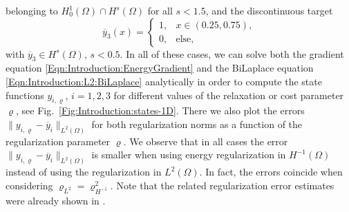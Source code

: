\documentclass{article}
\numberwithin{equation}{section}
\begin{document}
belonging to $H^1_0(\Omega)\cap H^s(\Omega)$ for all $s<1.5$,
and the discontinuous target
\begin{equation}\label{Eqn:Introduction:target-u3}
  \overline{y}_3(x) = \begin{cases}
    1,& x\in (0.25,0.75),\\
    0,& \text{else},
  \end{cases}
\end{equation}
with $\overline{y}_3 \in H^s(\Omega)$, $s<0.5$. In all of these cases, we can
solve both the gradient equation \eqref{Eqn:Introduction:EnergyGradient} and
the BiLaplace equation \eqref{Eqn:Introduction:L2:BiLaplace} analytically in
order to compute the state functions $y_{i,\varrho}$, $i=1,2,3$
for different values of the relaxation or cost parameter $\varrho$, see
Fig.~\ref{Fig:Introduction:states-1D}. There we also plot the
errors $\| y_{i,\varrho} - \overline{y}_i \|_{L^2(\Omega)}$ for both
regularization norms as a function of the regularization parameter
$\varrho$. We observe that in all cases the error
$\| y_{i,\varrho} - \overline{y}_i \|_{L^2(\Omega)}$ is smaller when using
energy regularization in $H^{-1}(\Omega)$ instead of using the
regularization in $L^2(\Omega)$. In fact, the errors coincide when
considering $\varrho_{L^2} = \varrho_{H^{-1}}^2$. Note that the related
regularization error estimates were already shown in
\cite{NeumuellerSteinbach:2021M2AS}.
\end{document}
